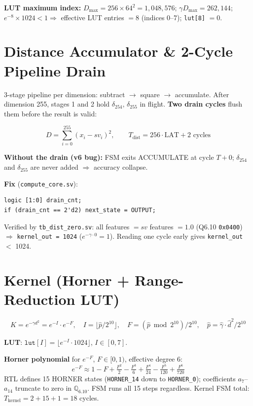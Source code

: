 \documentclass[10pt]{article}
\begin{document}
\textbf{LUT maximum index:} $D_{\max} = 256 \times 64^2 = 1{,}048{,}576$;
$\gamma D_{\max} = 262{,}144$; $e^{-8}\times 1024 < 1 \Rightarrow$
effective LUT entries $= 8$ (indices 0--7); \texttt{lut[8]} $= 0$.

\section{Distance Accumulator \& 2-Cycle Pipeline Drain}

3-stage pipeline per dimension: subtract $\to$ square $\to$ accumulate.
After dimension 255, stages 1 and 2 hold $\delta_{254},\,\delta_{255}$ in flight.
\textbf{Two drain cycles} flush them before the result is valid:

\[
D = \sum_{i=0}^{255}(x_i - sv_i)^2,\qquad
T_{\text{dist}} = 256\cdot\text{LAT} + 2 \text{ cycles}
\]

\textbf{Without the drain (v6 bug):} FSM exits ACCUMULATE at cycle $T{+}0$;
$\delta_{254}$ and $\delta_{255}$ are never added $\Rightarrow$ accuracy collapse.

\textbf{Fix} (\texttt{compute\_core.sv}):
\begin{verbatim}
logic [1:0] drain_cnt;
if (drain_cnt == 2'd2) next_state = OUTPUT;
\end{verbatim}
Verified by \texttt{tb\_dist\_zero.sv}: all features $= sv$ features
$= 1.0$ (Q6.10 \texttt{0x0400}) $\Rightarrow$ \texttt{kernel\_out = 1024}
($e^{-\gamma\cdot 0} = 1$). Reading one cycle early gives \texttt{kernel\_out} $<$ 1024.

\section{Kernel (Horner + Range-Reduction LUT)}

\[
K = e^{-\gamma d^2} = e^{-I}\cdot e^{-F}, \quad
I = \lfloor\hat{p}/2^{10}\rfloor,\quad
F = (\hat{p}\bmod 2^{10})/2^{10},\quad
\hat{p} = \hat{\gamma}\cdot\hat{d}^2 / 2^{10}
\]

\textbf{LUT}: $\texttt{lut}[I] = \lfloor e^{-I}\cdot 1024\rfloor$, $I\in[0,7]$.

\textbf{Horner polynomial} for $e^{-F}$, $F\in[0,1)$, effective degree 6:
\[
e^{-F}\approx 1 - F + \tfrac{F^2}{2} - \tfrac{F^3}{6} + \tfrac{F^4}{24} - \tfrac{F^5}{120} + \tfrac{F^6}{720}
\]
RTL defines 15 HORNER states (\texttt{HORNER\_14} down to \texttt{HORNER\_0}); coefficients
$a_7$--$a_{14}$ truncate to zero in $\mathbb{Q}_{6.10}$. FSM runs all 15 steps regardless.
Kernel FSM total: $T_{\text{kernel}} = 2 + 15 + 1 = 18$ cycles.
\end{document}
